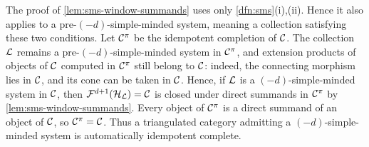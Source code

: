 \documentclass[11pt,a4paper,dvipsnames,x11names]{amsart}
\begin{document}
\begin{rmk}\label{rmk:idempotent-complete}
The proof of \cref{lem:sms-window-summands} uses only \cref{dfn:sms}(i),(ii). Hence it also applies to a pre-$(-d)$-simple-minded system, meaning a collection satisfying these two conditions. Let $\mathcal C^\pi$ be the idempotent completion of $\mathcal C$. The collection $\mathcal L$ remains a pre-$(-d)$-simple-minded system in $\mathcal C^\pi$, and extension products of objects of $\mathcal C$ computed in $\mathcal C^\pi$ still belong to $\mathcal C$: indeed, the connecting morphism lies in $\mathcal C$, and its cone can be taken in $\mathcal C$. Hence, if $\mathcal L$ is a $(-d)$-simple-minded system in $\mathcal C$, then $\mathcal F^{d+1}(\mathcal H_{\mathcal L})=\mathcal C$ is closed under direct summands in $\mathcal C^\pi$ by \cref{lem:sms-window-summands}. Every object of $\mathcal C^\pi$ is a direct summand of an object of $\mathcal C$, so $\mathcal C^\pi=\mathcal C$. Thus a triangulated category admitting a $(-d)$-simple-minded system is automatically idempotent complete.
\end{rmk}
\end{document}
